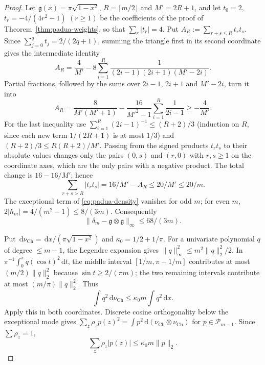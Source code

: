 \documentclass[preprint,12pt,a4paper]{elsarticle}
\theoremstyle{remark}
\newcommand{\dd}{\,\mathrm d}
\begin{document}
\begin{proof}
Let $\mathfrak g(x)=\pi\sqrt{1-x^2}$, $R=\lfloor m/2\rfloor$ and $M'=2R+1$, and let
$t_0=2$, $t_r=-4/(4r^2-1)$ $(r\ge1)$ be the coefficients of the proof of
Theorem~\ref{thm:padua-weights}, so that $\sum_r|t_r|=4$. Put
$A_R:=\sum_{r+s\le R}t_rt_s$. Since $\sum_{j=0}^q t_j=2/(2q+1)$, summing the
triangle first in its second coordinate gives the intermediate identity
\[
 A_R=\frac4{M'}-8\sum_{i=1}^R
       \frac1{(2i-1)(2i+1)(M'-2i)}.
\]
Partial fractions, followed by the sums over $2i-1$, $2i+1$ and $M'-2i$,
turn it into
\[
 A_R=\frac8{M'(M'+1)}-\frac{16}{M'^2-1}
              \sum_{i=1}^R\frac1{2i-1}\ge-\frac4{M'}.
\]
For the last inequality use
$\sum_{i=1}^R(2i-1)^{-1}\le(R+2)/3$ (induction on $R$, since each new term
$1/(2R+1)$ is at most $1/3$) and $(R+2)/3\le R(R+2)/M'$.
Passing from the signed products $t_rt_s$ to their absolute values changes only
the pairs $(0,s)$ and $(r,0)$ with $r,s\ge1$ on the coordinate axes, which are
the only pairs with a negative product. The total change is $16-16/M'$; hence
\[
 \sum_{r+s>R}|t_rt_s|=16/M'-A_R\le20/M'\le20/m.
\]
The exceptional term of \eqref{eq:padua-density} vanishes for odd $m$;
for even $m$, $2|h_m|=4/(m^2-1)\le8/(3m)$. Consequently
\begin{equation}\label{eq:padua-density-tail}
 \|\delta_m-\mathfrak g\otimes\mathfrak g\|_\infty\le68/(3m).
\end{equation}

Put $\dd\nu_{\mathrm{Ch}}=\dd x/(\pi\sqrt{1-x^2})$ and $\kappa_0=1/2+1/\pi$.
For a univariate polynomial $q$ of degree $\le m-1$, the Legendre
expansion gives $\|q\|_\infty^2\le m^2\|q\|_2^2/2$.
In $\pi^{-1}\int_0^\pi q(\cos t)^2\dd t$, the middle interval
$[1/m,\pi-1/m]$ contributes at most $(m/2)\|q\|_2^2$ because
$\sin t\ge2/(\pi m)$; the two remaining intervals contribute at most
$(m/\pi)\|q\|_2^2$. Thus
\[
 \int q^2\dd\nu_{\mathrm{Ch}}\le\kappa_0 m\int q^2\dd x.
\]
Apply this in both coordinates. Discrete cosine orthogonality below
the exceptional mode gives
$\sum_z\rho_zp(z)^2=\int p^2\dd(\nu_{\mathrm{Ch}}\otimes\nu_{\mathrm{Ch}})$
for $p\in\mathcal P_{m-1}$. Since $\sum\rho_z=1$,
\begin{equation}\label{eq:padua-raw-L1}
 \sum_z\rho_z|p(z)|\le\kappa_0 m\|p\|_2.
\end{equation}


\end{proof}
\end{document}
